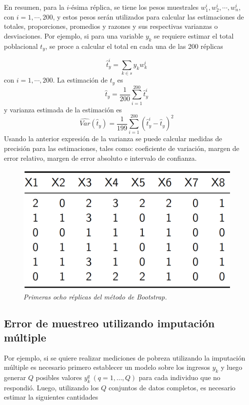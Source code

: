 \documentclass[
  12pt,
  spanish,
]{book}
\begin{document}
En resumen, para la \(i\)-ésima réplica, se tiene los pesos muestrales \(w_1^i,w_2^i, \cdots, w_n^i\), con \(i=1,\cdots,200\), y estos pesos serán utilizados para calcular las estimaciones de totales, proporciones, promedios y razones y sus respectivas varianzas o desviaciones. Por ejemplo, si para una variable \(y_k\) se requiere estimar el total poblacional \(t_y\), se proce a calcular el total en cada una de las 200 réplicas

\[\hat{t}_y^i=\sum_{k\in s} y_kw_k^i\]
con \(i=1,\cdots,200\). La estimación de \(t_y\) es
\[\hat{t}_y=\frac{1}{200}\sum_{i=1}^{200}\hat{t}_y^i\]
y varianza estimada de la estimación es
\[\hat{Var}(\hat{t}_y)=\frac{1}{199}\sum_{i=1}^{200}(\hat{t}_y^i-\hat{t}_y)^2\]
Usando la anterior expresión de la varianza se puede calcular medidas de precisión para las estimaciones, tales como: coeficiente de variación, margen de error relativo, margen de error absoluto e intervalo de confianza.

\begin{figure}
\centering
\includegraphics{Pics/23.png}
\caption{\emph{Primeras ocho réplicas del método de Bootstrap.}}
\end{figure}

\hypertarget{error-de-muestreo-utilizando-imputaciuxf3n-muxfaltiple}{%
\subsection*{Error de muestreo utilizando imputación múltiple}\label{error-de-muestreo-utilizando-imputaciuxf3n-muxfaltiple}}

Por ejemplo, si se quiere realizar mediciones de pobreza utilizando la imputación múltiple es necesario primero establecer un modelo sobre los ingresos \(y_k\) y luego generar \(Q\) posibles valores \(y_k^q \ (q=1, \ldots, Q)\) para cada individuo que no respondió. Luego, utilizando los \(Q\) conjuntos de datos completos, es necesario estimar la siguientes cantidades
\end{document}

